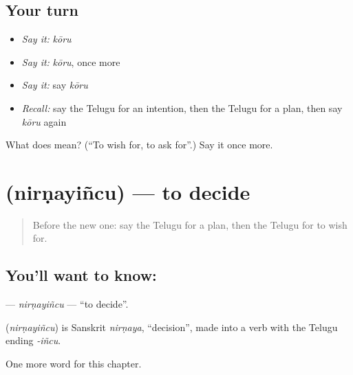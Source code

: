 \subsection*{Your turn}
\begin{itemize}
\raggedright
  \item \emph{Say it:} \emph{kōru}
  \item \emph{Say it:} \emph{kōru}, once more
  \item \emph{Say it:} say \emph{kōru}
  \item \emph{Recall:} say the Telugu for an intention, then the Telugu for a plan, then say \emph{kōru} again
\end{itemize}

\begin{tcolorbox}[breakable,colback=teal!4,colframe=teal!35!black,title={Before you move on}]
What does  mean? (\textquotedblleft{}To wish for, to ask for\textquotedblright{}.) Say it once more.
\end{tcolorbox}
\section[\texorpdfstring{\te{నిర్ణయించు} (nirṇayiñcu)}{నిర్ణయించు (nirṇayiñcu)}]{ (nirṇayiñcu) — to decide}

\label{lesson:TE-C108-nirnayincu}



\begin{quote}
Before the new one: say the Telugu for a plan, then the Telugu for to wish for.
\end{quote}

\subsection*{You'll want to know: }
\textbf{} — \emph{nirṇayiñcu} — \textquotedblleft{}to decide\textquotedblright{}.

\begin{cousinweb}
\textbf{} (\emph{nirṇayiñcu}) is Sanskrit \emph{nirṇaya}, \textquotedblleft{}decision\textquotedblright{}, made into a verb with the Telugu ending \emph{-iñcu}.
\end{cousinweb}

\begin{grammarlens}[title={What you've built}]
One more word for this chapter.
\end{grammarlens}

